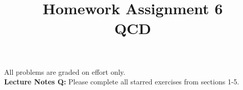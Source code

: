 \documentclass[12pt]{article}
\begin{document}
\date{\vspace{-5ex}}

\title{Homework Assignment 6 \\ QCD}

\maketitle

\noindent
All problems are graded on effort only.\\

\noindent
{\bf Lecture Notes Q:} Please complete all starred exercises from
sections 1-5.\\
\end{document}
